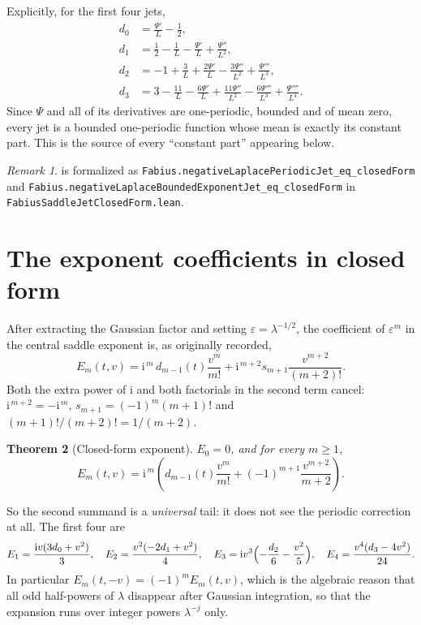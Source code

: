\documentclass[11pt,oneside]{article}
\newtheorem{theorem}{Theorem}[section]
\theoremstyle{definition}
\theoremstyle{remark}
\newtheorem{remark}[theorem]{Remark}
\newcommand{\ii}{\mathrm i}
\begin{document}
Explicitly, for the first four jets,
\[
\begin{aligned}
  d_0&=\frac{\Psi'}{L}-\frac12,\\
  d_1&=\frac12-\frac1L-\frac{\Psi'}{L}+\frac{\Psi''}{L^2},\\
  d_2&=-1+\frac3L+\frac{2\Psi'}{L}-\frac{3\Psi''}{L^2}+\frac{\Psi'''}{L^3},\\
  d_3&=3-\frac{11}{L}-\frac{6\Psi'}{L}+\frac{11\Psi''}{L^2}
        -\frac{6\Psi'''}{L^3}+\frac{\Psi''''}{L^4}.
\end{aligned}
\]
Since $\Psi$ and all of its derivatives are one-periodic, bounded and of mean
zero, every jet is a bounded one-periodic function whose mean is exactly its
constant part.  This is the source of every ``constant part'' appearing below.

\begin{remark}
 is formalized as
\nolinkurl{Fabius.negativeLaplacePeriodicJet_eq_closedForm} and
\nolinkurl{Fabius.negativeLaplaceBoundedExponentJet_eq_closedForm}
in \nolinkurl{FabiusSaddleJetClosedForm.lean}.
\end{remark}

\section{The exponent coefficients in closed form}\label{smallarg:sec:exponent}

After extracting the Gaussian factor and setting $\varepsilon=\lambda^{-1/2}$,
the coefficient of $\varepsilon^m$ in the central saddle exponent is, as
originally recorded,
\[
  E_m(t,v)=\ii^{\,m}\,d_{m-1}(t)\frac{v^m}{m!}
    +\ii^{\,m+2}s_{m+1}\frac{v^{m+2}}{(m+2)!}.
\]
Both the extra power of $\ii$ and both factorials in the second term cancel:
$\ii^{\,m+2}=-\ii^{\,m}$, $s_{m+1}=(-1)^m(m+1)!$ and
$(m+1)!/(m+2)!=1/(m+2)$.

\begin{theorem}[Closed-form exponent]\label{smallarg:thm:exponent}
$E_0=0$, and for every $m\ge1$,
\[
  E_m(t,v)=\ii^{\,m}\left(d_{m-1}(t)\frac{v^m}{m!}
    +(-1)^{m+1}\frac{v^{m+2}}{m+2}\right).
\]
\end{theorem}

So the second summand is a \emph{universal} tail: it does not see the periodic
correction at all.  The first four are
\[
  E_1=\frac{\ii v(3d_0+v^2)}{3},\quad
  E_2=\frac{v^2(-2d_1+v^2)}{4},\quad
  E_3=\ii v^3\Bigl(-\frac{d_2}{6}-\frac{v^2}{5}\Bigr),\quad
  E_4=\frac{v^4(d_3-4v^2)}{24}.
\]
In particular $E_m(t,-v)=(-1)^mE_m(t,v)$, which is the algebraic reason that
all odd half-powers of $\lambda$ disappear after Gaussian integration, so that
the expansion runs over integer powers $\lambda^{-j}$ only.
\end{document}
